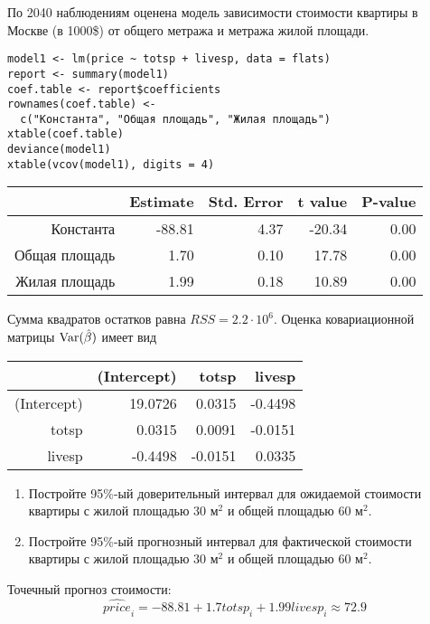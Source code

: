 \begin{problem} %
По 2040 наблюдениям оценена модель зависимости стоимости квартиры в Москве (в 1000\$) от общего метража и метража жилой площади.

\begin{verbatim}
model1 <- lm(price ~ totsp + livesp, data = flats)
report <- summary(model1)
coef.table <- report$coefficients
rownames(coef.table) <-
  c("Константа", "Общая площадь", "Жилая площадь")
xtable(coef.table)
deviance(model1)
xtable(vcov(model1), digits = 4)
\end{verbatim}

\begin{tabular}{rrrrr}
  \hline
 & Estimate & Std. Error & t value & P-value \\
  \hline
Константа & -88.81 & 4.37 & -20.34 & 0.00 \\
  Общая площадь & 1.70 & 0.10 & 17.78 & 0.00 \\
  Жилая площадь & 1.99 & 0.18 & 10.89 & 0.00 \\
   \hline
\end{tabular}



Сумма квадратов остатков равна $RSS=2.2\cdot 10^6$.
Оценка ковариационной матрицы $\operatorname{Var}(\hat{\beta})$ имеет вид

\begin{tabular}{rrrr}
  \hline
 & (Intercept) & totsp & livesp \\
  \hline
(Intercept) & 19.0726 & 0.0315 & -0.4498 \\
  totsp & 0.0315 & 0.0091 & -0.0151 \\
  livesp & -0.4498 & -0.0151 & 0.0335 \\
   \hline
\end{tabular}



\begin{enumerate}
\item Постройте 95\%-ый доверительный интервал для ожидаемой стоимости квартиры с жилой площадью $30$ м$^2$ и общей площадью $60$ м$^2$.
\item Постройте 95\%-ый прогнозный интервал для фактической стоимости квартиры с жилой площадью $30$ м$^2$ и общей площадью $60$ м$^2$.
\end{enumerate}


\begin{sol}
Точечный прогноз стоимости:
\[
\widehat{price}_i= -88.81+1.7totsp_i + 1.99livesp_i \approx 72.9
\]


\end{sol}
\end{problem}
